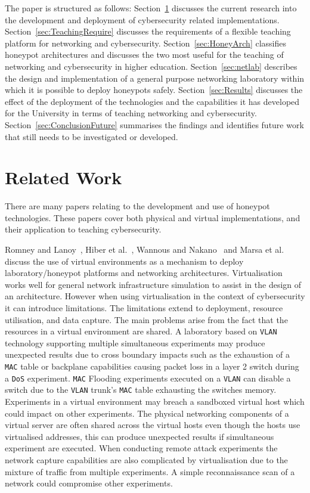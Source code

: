 \documentclass{ieeeaccess}
\begin{document}
The paper is structured as follows: Section~\ref{sec:RelatedWork} discusses the
current research into the development and deployment of cybersecurity related
implementations. Section~\ref{sec:TeachingRequire} discusses the requirements
of a flexible teaching platform for networking and cybersecurity.
Section~\ref{sec:HoneyArch} classifies honeypot architectures and discusses the
two most useful for the teaching of networking and cybersecurity in higher
education.  Section~\ref{sec:netlab} describes the design and implementation of
a general purpose networking laboratory within which it is possible to deploy
honeypots safely.  Section~\ref{sec:Results} discusses the effect of the
deployment of the technologies and the capabilities it has developed for the
University in terms of teaching networking and cybersecurity.
Section~\ref{sec:ConclusionFuture} summarises the findings and identifies
future work that still needs to be investigated or developed.

\section{Related Work}\label{sec:RelatedWork}
There are many papers relating to the development and use of honeypot
technologies. These papers cover both physical and virtual implementations, and
their application to teaching cybersecurity. 

Romney and Lanoy~\cite{LR:06}, Hiber et al.~\cite{HRS:08}, Wannous and
Nakano~\cite{WN:10} and Marsa et al.~\cite{MGDL:13} discuss the use of virtual
environments as a mechanism to deploy laboratory/honeypot platforms and
networking architectures. Virtualisation works well for general network
infrastructure simulation to assist in the design of an architecture. However
when using virtualisation in the context of cybersecurity it can introduce
limitations. The limitations extend to deployment, resource utilisation, and
data capture. The main problems arise from the fact that the resources in a
virtual environment are shared. A laboratory based on \texttt{VLAN} technology
supporting multiple simultaneous experiments may produce unexpected results due
to cross boundary impacts such as the exhaustion of a \texttt{MAC} table or
backplane capabilities causing packet loss in a layer 2 switch during a
\texttt{DoS} experiment. \texttt{MAC} Flooding experiments executed on a
\texttt{VLAN} can disable a switch due to the \texttt{VLAN} trunk's
\texttt{MAC} table exhausting the switches memory. Experiments in a virtual
environment may breach a sandboxed virtual host which could impact on other
experiments. The physical networking components of a virtual server are often
shared across the virtual hosts even though the hosts use virtualised
addresses, this can produce unexpected results if simultaneous experiment are
executed. When conducting remote attack experiments the network capture
capabilities are also complicated by virtualisation due to the mixture of
traffic from multiple experiments. A simple reconnaissance scan of a network
could compromise other experiments.
\end{document}
